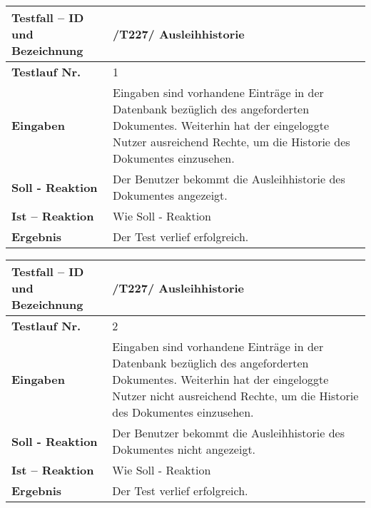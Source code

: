 \begin{longtable}{|p{5cm}|p{10cm}|}
\hline
\textbf{Testfall -- ID und Bezeichnung} & \textnormal{/T227/ Ausleihhistorie} \\
\hline
\textbf{Testlauf Nr.} & \textnormal{1} \\
\hline
\textbf{Eingaben} & \textnormal{Eingaben sind vorhandene Einträge in der Datenbank
bezüglich des angeforderten Dokumentes. Weiterhin hat der eingeloggte Nutzer
ausreichend Rechte, um die Historie des Dokumentes einzusehen. } \\
\hline
\textbf{Soll - Reaktion} & \textnormal{Der Benutzer bekommt die Ausleihhistorie des
Dokumentes angezeigt. } \\
\hline
\textbf{Ist -- Reaktion} & \textnormal{Wie Soll - Reaktion} \\
\hline
\textbf{Ergebnis} & \textnormal{Der Test verlief erfolgreich. } \\
\hline
 \end{longtable}

\begin{longtable}{|p{5cm}|p{10cm}|}
\hline
\textbf{Testfall -- ID und Bezeichnung} & \textnormal{/T227/ Ausleihhistorie} \\
\hline
\textbf{Testlauf Nr.} & \textnormal{2} \\
\hline
\textbf{Eingaben} & \textnormal{Eingaben sind vorhandene Einträge in der Datenbank
bezüglich des angeforderten Dokumentes. Weiterhin hat der eingeloggte Nutzer
nicht ausreichend Rechte, um die Historie des Dokumentes einzusehen. } \\
\hline
\textbf{Soll - Reaktion} & \textnormal{Der Benutzer bekommt die Ausleihhistorie des
Dokumentes nicht angezeigt. } \\
\hline
\textbf{Ist -- Reaktion} & \textnormal{Wie Soll - Reaktion} \\
\hline
\textbf{Ergebnis} & \textnormal{Der Test verlief erfolgreich. } \\
\hline
 \end{longtable}
